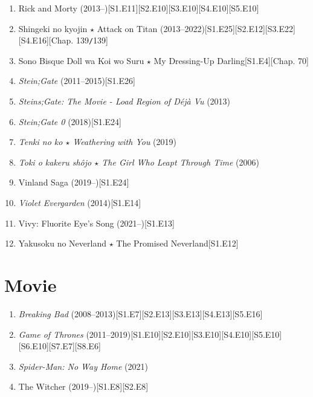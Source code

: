 \documentclass{article}
\begin{document}
\begin{enumerate}
    Rascal Does Not Dream of Bunny Girl Senpai (2018--)\hfill[S1.E14]
    \item Rick and Morty (2013--)\hfill[S1.E11][S2.E10][S3.E10][S4.E10][S5.E10]
    \item Shingeki no kyojin $\star$ Attack on Titan (2013--2022)\hfill[S1.E25][S2.E12][S3.E22][S4.E16][Chap. 139\texttt{/}139]
    \item Sono Bisque Doll wa Koi wo Suru $\star$ My Dressing-Up Darling\hfill[S1.E4][Chap. 70]
    \item \textit{Stein;Gate} (2011--2015)\hfill[S1.E26]
    \item \textit{Steins;Gate: The Movie - Load Region of Déjà Vu} (2013)
    \item \textit{Stein;Gate 0} (2018)\hfill[S1.E24]
    \item \textit{Tenki no ko $\star$ Weathering with You} (2019)
    \item \textit{Toki o kakeru sh\^ojo $\star$ The Girl Who Leapt Through Time} (2006)
    \item Vinland Saga (2019--)\hfill[S1.E24]
    \item \textit{Violet Evergarden} (2014)\hfill[S1.E14]
    \item Vivy: Fluorite Eye's Song (2021--)\hfill[S1.E13]
    \item Yakusoku no Neverland $\star$ The Promised Neverland\hfill[S1.E12]
\end{enumerate}


\section{Movie}
\begin{enumerate}
	\item \textit{Breaking Bad} (2008--2013)\hfill[S1.E7][S2.E13][S3.E13][S4.E13][S5.E16]
	\item \textit{Game of Thrones} (2011--2019)\hfill[S1.E10][S2.E10][S3.E10][S4.E10][S5.E10][S6.E10][S7.E7][S8.E6]
	\item \textit{Spider-Man: No Way Home} (2021)
	\item The Witcher (2019--)\hfill[S1.E8][S2.E8]
\end{enumerate}

\end{document}
